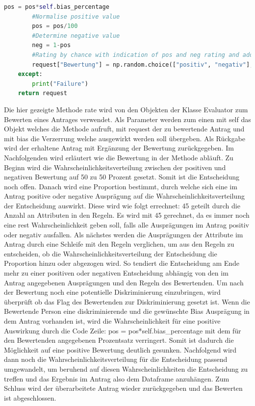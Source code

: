 \begin{onehalfspace}
\begin{lstlisting}[language=Python,label={lst:Evaluator_rate},caption=Methode eines Bewertenden zum Bewerten von Anträgen]
                    pos = pos*self.bias_percentage
        #Normalise positive value
        pos = pos/100
        #Determine negative value
        neg = 1-pos
        #Rating by chance with indication of pos and neg rating and adding the rating to the request. 
        request["Bewertung"] = np.random.choice(["positiv", "negativ"], p=[pos, neg])
    except:
        print("Failure")
    return request
\end{lstlisting}
Die hier gezeigte Methode \glqq{}rate\grqq{} wird von den Objekten der Klasse \glqq{}Evaluator\grqq{} zum Bewerten eines Antrages verwendet. Als Parameter werden zum einen mit \glqq{}self\grqq{} das Objekt welches die Methode aufruft, mit \glqq{}request\grqq{} der zu bewertende Antrag und mit \glqq{}bias\grqq{} die Verzerrung welche ausgewirkt werden soll übergeben. Als Rückgabe wird der erhaltene Antrag mit Ergänzung der Bewertung zurückgegeben. Im Nachfolgenden wird erläutert wie die Bewertung in der Methode abläuft.
Zu Beginn wird die Wahrscheinlichkeitsverteilung zwischen der positiven und negativen Bewertung auf 50 zu 50 Prozent gesetzt. Somit ist die Entscheidung noch offen. Danach wird eine Proportion bestimmt, durch welche sich eine im Antrag positive oder negative Ausprägung auf die Wahrscheinlichkeitsverteilung der Entscheidung auswirkt. Diese wird wie folgt errechnet: 45 geteilt durch die Anzahl an Attributen in den Regeln. Es wird mit 45 gerechnet, da es immer noch eine rest Wahrscheinlichkeit geben soll, falls alle Ausprägungen im Antrag positiv oder negativ ausfallen. Als nächstes werden die Ausprägungen der Attribute im Antrag durch eine Schleife mit den Regeln verglichen, um aus den Regeln zu entscheiden, ob die Wahrscheinlichkeitsverteilung der Entscheidung die Proportion hinzu oder abgezogen wird. So tendiert die Entscheidung am Ende mehr zu einer positiven oder negativen Entscheidung abhängig von den im Antrag angegebenen Ausprägungen und den Regeln des Bewertenden. Um nach der Bewertung noch eine potentielle Diskriminierung einzubringen, wird überprüft ob das Flag des Bewertenden zur Diskriminierung gesetzt ist. Wenn die Bewertende Person eine diskriminierende und die gewünschte Bias Ausprägung in dem Antrag vorhanden ist, wird die Wahrscheinlichkeit für eine positive Auswirkung durch die Code Zeile: \glqq{}pos = pos*self.bias\_percentage\grqq{} mit dem für den Bewertenden angegebenen Prozentsatz verringert. Somit ist dadurch die Möglichkeit auf eine positive Bewertung deutlich gesunken. Nachfolgend wird dann noch die Wahrscheinlichkeitsverteilung für die Entscheidung passend umgewandelt, um beruhend auf diesen Wahrscheinlichkeiten die Entscheidung zu treffen und das Ergebnis im Antrag also dem Dataframe anzuhängen. Zum Schluss wird der überarbeitete Antrag wieder zurückgegeben und das Bewerten ist abgeschlossen.\\

\end{onehalfspace}
